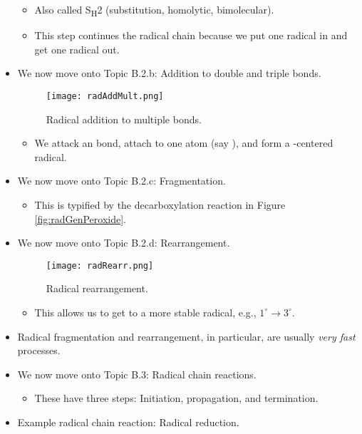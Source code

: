 \documentclass[../notes.tex]{subfiles}
\begin{document}
\begin{itemize}
    \begin{itemize}
        \item Also called S\textsubscript{H}2 (substitution, homolytic, bimolecular).
        \item This step continues the radical chain because we put one radical in and get one radical out.
    \end{itemize}
    \item We now move onto Topic B.2.b{}: Addition to double and triple bonds.
    \begin{figure}[h!]
        \centering
        \texttt{[image: radAddMult.png]}
        \caption{Radical addition to multiple bonds.}
        \label{fig:radAddMult}
    \end{figure}
    \begin{itemize}
        \item We attack an  bond, attach to one atom (say ), and form a -centered radical.
    \end{itemize}
    \item We now move onto Topic B.2.c{}: Fragmentation.
    \begin{itemize}
        \item This is typified by the decarboxylation reaction in Figure \ref{fig:radGenPeroxide}.
    \end{itemize}
    \item We now move onto Topic B.2.d{}: Rearrangement.
    \begin{figure}[h!]
        \centering
        \texttt{[image: radRearr.png]}
        \caption{Radical rearrangement.}
        \label{fig:radRearr}
    \end{figure}
    \begin{itemize}
        \item This allows us to get to a more stable radical, e.g., $1^\circ\to 3^\circ$.
    \end{itemize}
    \item Radical fragmentation and rearrangement, in particular, are usually \emph{very fast} processes.
    \item We now move onto Topic B.3: Radical chain reactions.
    \begin{itemize}
        \item These have three steps: Initiation, propagation, and termination.
    \end{itemize}
    \item Example radical chain reaction: Radical reduction.

\end{itemize}
\end{document}
